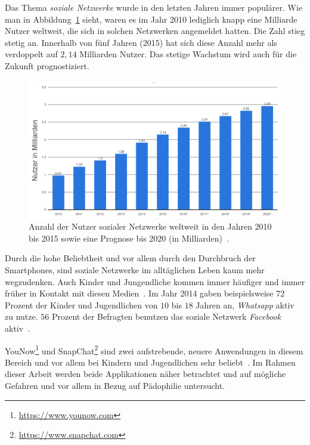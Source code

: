 Das Thema \emph{soziale Netzwerke} wurde in den letzten Jahren immer
popul\"arer. Wie man in Abbildung~\ref{fig:overall} sieht, waren es im Jahr
2010 lediglich knapp eine Milliarde Nutzer weltweit, die sich in solchen
Netzwerken angemeldet hatten. Die Zahl stieg stetig an. Innerhalb von f\"unf
Jahren (2015) hat sich diese Anzahl mehr als verdoppelt auf $2,14$ Milliarden
Nutzer. Das stetige Wachstum wird auch f\"ur die Zukunft prognostiziert.
\begin{figure}[ht]
	\centering
	\includegraphics[scale=0.6]{resources/einf_02.png}
	\caption{Anzahl der Nutzer sozialer Netzwerke weltweit in den Jahren 2010
	bis 2015 sowie eine Prognose bis 2020 (in Milliarden)~\cite{statista-allg}.}
	\label{fig:overall}
\end{figure}

Durch die hohe Beliebtheit und vor allem durch den Durchbruch der Smartphones,
sind soziale Netzwerke im allt\"aglichen Leben kaum mehr wegzudenken. Auch
Kinder und Jungendliche kommen immer h\"aufiger und immer fr\"uher in Kontakt
mit diesen Medien~\cite{statista-jugendliche}. Im Jahr 2014 gaben
beispielsweise $72$ Prozent der Kinder und Jugendlichen von $10$ bis $18$
Jahren an, \emph{Whatsapp} aktiv zu nutze. $56$ Prozent der Befragten benutzen
das soziale Netzwerk \emph{Facebook} aktiv~\cite{statista-jugendliche}.


YouNow\footnote{\url{https://www.younow.com}} und
SnapChat\footnote{\url{https://www.snapchat.com}} sind zwei aufstrebende,
neuere Anwendungen in diesem Bereich und vor allem bei Kindern und Jugendlichen
sehr beliebt~\cite{statista-snapchat, vaterlaus2016snapchat}. Im Rahmen dieser
Arbeit werden beide Applikationen n\"aher betrachtet und auf m\"ogliche
Gefahren und vor allem in Bezug auf P\"adophilie untersucht.
